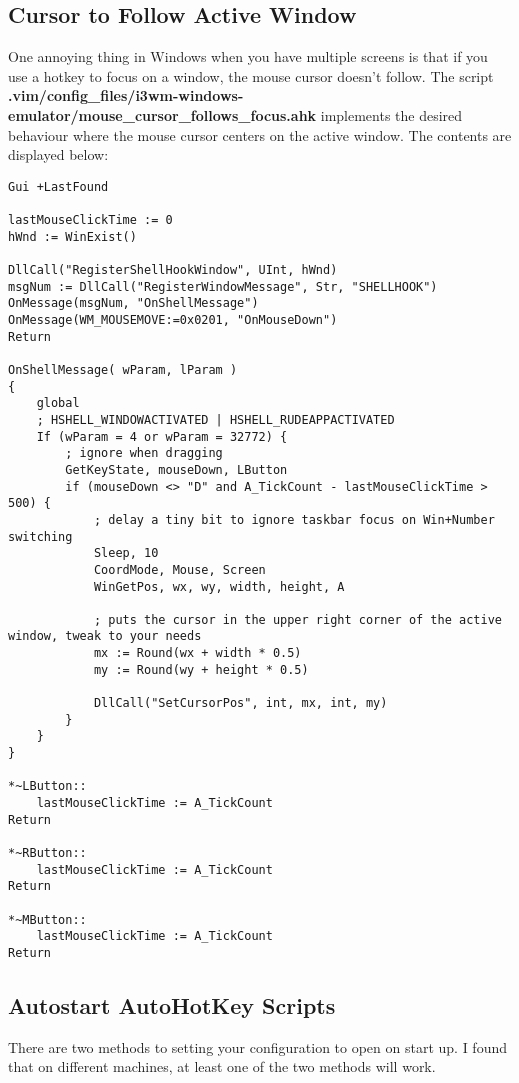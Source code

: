 \subsection{Cursor to Follow Active Window}
One annoying thing in Windows when you have multiple screens is that if you use
a hotkey to focus on a window, the mouse cursor doesn't follow. The script
\textbf{.vim/config\_files/i3wm-windows-emulator/mouse\_cursor\_follows\_focus.ahk}
implements the desired behaviour where the mouse cursor centers on the active
window. The contents are displayed below:
\begin{lstlisting}
Gui +LastFound

lastMouseClickTime := 0
hWnd := WinExist()

DllCall("RegisterShellHookWindow", UInt, hWnd)
msgNum := DllCall("RegisterWindowMessage", Str, "SHELLHOOK")
OnMessage(msgNum, "OnShellMessage")
OnMessage(WM_MOUSEMOVE:=0x0201, "OnMouseDown")
Return

OnShellMessage( wParam, lParam )
{
	global
	; HSHELL_WINDOWACTIVATED | HSHELL_RUDEAPPACTIVATED
	If (wParam = 4 or wParam = 32772) {
		; ignore when dragging
		GetKeyState, mouseDown, LButton
		if (mouseDown <> "D" and A_TickCount - lastMouseClickTime > 500) {
			; delay a tiny bit to ignore taskbar focus on Win+Number switching
			Sleep, 10
			CoordMode, Mouse, Screen
			WinGetPos, wx, wy, width, height, A

			; puts the cursor in the upper right corner of the active window, tweak to your needs
			mx := Round(wx + width * 0.5)
			my := Round(wy + height * 0.5)

			DllCall("SetCursorPos", int, mx, int, my)
		}
	}
}

*~LButton::
	lastMouseClickTime := A_TickCount
Return

*~RButton::
	lastMouseClickTime := A_TickCount
Return

*~MButton::
	lastMouseClickTime := A_TickCount
Return
\end{lstlisting}

\subsection{Autostart AutoHotKey Scripts} \label{SecAutostart}
There are two methods to setting your configuration to open on start up. I found
that on different machines, at least one of the two methods will work.\\

